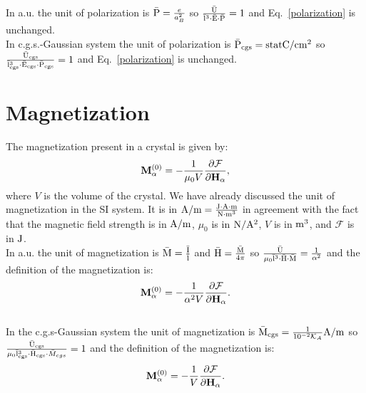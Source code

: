 \documentclass[12pt,a4paper,twoside]{report}
\begin{document}
{\color{web-blue} In a.u. the unit of polarization is 
${\rm \bar P}= {e \over a_B^2}$ so ${{\rm \bar U} \over {\rm \bar l}^3 
\cdot {\rm \bar E} \cdot {\rm \bar P}}=1$ and
Eq.~\ref{polarization} is unchanged.
}
\\

{\color{orange} In c.g.s.-Gaussian system the unit of polarization is 
${\rm \bar P_{cgs}}= {\rm statC}/{\rm cm}^2$ so ${{\rm \bar U_{cgs}} \over 
{\rm \bar l_{cgs}}^3 \cdot
{\rm \bar E_{cgs}}\cdot {\rm \bar P_{cgs}}}=1$ and
Eq.~\ref{polarization} is unchanged.
}

\newpage
{\color{coral}\section{Magnetization}}
\color{black}

The magnetization present in a crystal is given by:
\begin{equation}
{\bf M}^{(0)}_{\alpha}=-{1\over \mu_0 V} 
{\partial \mathcal{F} \over \partial {\bf H}_{\alpha}},
\label{magnetization}
\end{equation}
where $V$ is the volume of the crystal.
We have already discussed the unit of magnetization in the SI system. It is
in ${\rm A}/{\rm m}={{\rm J}\cdot {\rm A} \cdot {\rm m} \over {\rm N}\cdot {\rm m}^3}$ in agreement with the fact 
that the magnetic field strength is in ${\rm A}/{\rm m}$, $\mu_0$ is in ${\rm N}/{\rm A}^2$, $V$ is
in ${\rm m}^3$, and $\mathcal{F}$ is in ${\rm J}$.
\\

{\color{web-blue} In a.u. the unit of magnetization is 
${\rm \bar M}= {{\rm \bar I} \over {\rm \bar l}}$ and ${\rm \bar H} ={{\rm \bar M} \over 4 \pi}$ so 
${{\rm \bar U} \over \mu_0 {\rm \bar l}^3 \cdot {\rm \bar H}\cdot {\rm \bar M}}={1\over \alpha^2}$ and
the definition of the magnetization is:
\begin{equation}
{\bf M}^{(0)}_{\alpha}=-{1\over \alpha^2 V} 
{\partial \mathcal{F} \over \partial {\bf H}_{\alpha}}.
\label{magnetizationau}
\end{equation}
}
\\

{\color{orange} In the c.g.s-Gaussian system the unit of magnetization is 
${\rm \bar M_{cgs}}= {1\over 10^{-2} \mathcal{K}_A} {\rm A}/{\rm m}$ so 
${{\rm \bar U_{cgs}} \over \mu_0 {\rm \bar l_{cgs}}^3 
\cdot {\rm \bar H_{cgs}}\cdot {\bar M_{cgs}}}=1$ and the definition of the 
magnetization is:
\begin{equation}
{\bf M}^{(0)}_{\alpha}=-{1\over V} 
{\partial \mathcal{F} \over \partial {\bf H}_{\alpha}}.
\label{magnetizationcgs}
\end{equation}
}
\end{document}
